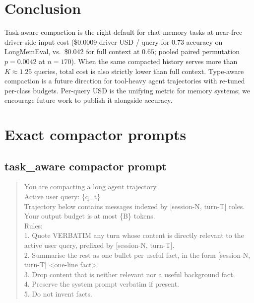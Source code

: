 \documentclass{article}
\begin{document}
\section{Conclusion}\label{sec:conc}

Task-aware compaction is the right default for chat-memory tasks at
near-free driver-side input cost (\$0.0009 driver USD / query for
$0.73$ accuracy on LongMemEval, vs.\ \$0.042 for full context at $0.65$;
pooled paired permutation $p{=}0.0042$ at $n{=}170$). When the same
compacted history serves more than $K \approx 1.25$ queries, total
cost is also strictly lower than full context. Type-aware compaction
is a future direction for tool-heavy agent trajectories with re-tuned
per-class budgets. Per-query USD is the unifying metric for memory
systems; we encourage future work to publish it alongside accuracy.




\appendix

\section{Exact compactor prompts}\label{app:prompts}

\subsection{\textsf{task\_aware} compactor prompt}

\begin{quote}\small\ttfamily
You are compacting a long agent trajectory.\\[2pt]
Active user query: \{q\_t\}\\[2pt]
Trajectory below contains messages indexed by [session-N, turn-T]
roles. Your output budget is at most \{B\} tokens.\\[2pt]
Rules:\\
1. Quote VERBATIM any turn whose content is directly relevant to the
active user query, prefixed by [session-N, turn-T].\\
2. Summarise the rest as one bullet per useful fact, in the form
[session-N, turn-T] <one-line fact>.\\
3. Drop content that is neither relevant nor a useful background fact.\\
4. Preserve the system prompt verbatim if present.\\
5. Do not invent facts.
\end{quote}
\end{document}
